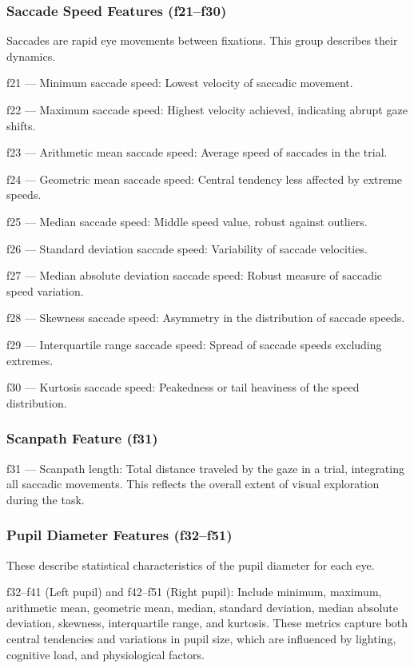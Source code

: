 \documentclass{article}
\begin{document}
\subsubsection{Saccade Speed Features (f21–f30)}

Saccades are rapid eye movements between fixations. This group describes their dynamics.

f21 — Minimum saccade speed: Lowest velocity of saccadic movement.

f22 — Maximum saccade speed: Highest velocity achieved, indicating abrupt gaze shifts.

f23 — Arithmetic mean saccade speed: Average speed of saccades in the trial.

f24 — Geometric mean saccade speed: Central tendency less affected by extreme speeds.

f25 — Median saccade speed: Middle speed value, robust against outliers.

f26 — Standard deviation saccade speed: Variability of saccade velocities.

f27 — Median absolute deviation saccade speed: Robust measure of saccadic speed variation.

f28 — Skewness saccade speed: Asymmetry in the distribution of saccade speeds.

f29 — Interquartile range saccade speed: Spread of saccade speeds excluding extremes.

f30 — Kurtosis saccade speed: Peakedness or tail heaviness of the speed distribution.

\subsubsection{Scanpath Feature (f31)}

f31 — Scanpath length: Total distance traveled by the gaze in a trial, integrating all saccadic movements. This reflects the overall extent of visual exploration during the task.

\subsubsection{Pupil Diameter Features (f32–f51)}

These describe statistical characteristics of the pupil diameter for each eye.

f32–f41 (Left pupil) and f42–f51 (Right pupil): Include minimum, maximum, arithmetic mean, geometric mean, median, standard deviation, median absolute deviation, skewness, interquartile range, and kurtosis. These metrics capture both central tendencies and variations in pupil size, which are influenced by lighting, cognitive load, and physiological factors.
\end{document}
